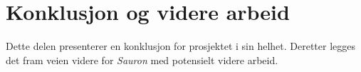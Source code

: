 \part{Konklusjon og videre arbeid}
Dette delen presenterer en konklusjon for prosjektet i sin helhet. Deretter legges det fram veien videre for \textit{Sauron} med potensielt videre arbeid.
\cleardoublepage %
\clearpage


